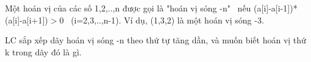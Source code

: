 Một hoán vị của các số 1,2,..,n được gọi là "hoán vị sóng -n"  nếu  (a[i]-a[i-1])*(a[i]-a[i+1])$>$0  (i=2,3,..,n-1). Ví dụ, (1,3,2) là một hoán vị sóng -3.  

   LC sắp xếp dãy hoán vị sóng -n theo thứ tự tăng dần, và muốn biết hoán vị thứ k trong dãy đó là gì.  

\